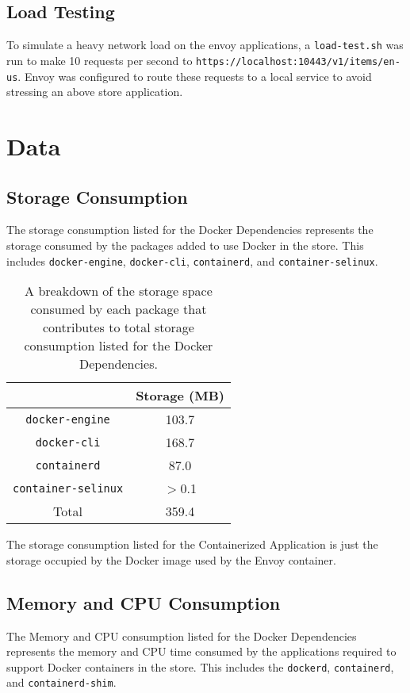\documentclass{article}
\begin{document}
\subsection{Load Testing}
To simulate a heavy network load on the envoy applications, a \texttt{load-test.sh} was run to make 10 requests per second to \texttt{https://localhost:10443/v1/items/en-us}. Envoy was configured to route these requests to a local service to avoid stressing an above store application.

\section{Data}
\subsection{Storage Consumption}
The storage consumption listed for the Docker Dependencies represents the storage consumed by the packages added to use Docker in the store. This includes \texttt{docker-engine}, \texttt{docker-cli}, \texttt{containerd}, and \texttt{container-selinux}.

\begin{table}[H]
\begin{tabular}{ |c|c| }
 \hline
   & Storage (MB) \\ 
 \hline
 \texttt{docker-engine} & 103.7 \\
 \hline
 \texttt{docker-cli} & 168.7 \\
 \hline
 \texttt{containerd} & 87.0 \\
 \hline
 \texttt{container-selinux} & $>$0.1 \\
 \hline\hline
 Total & 359.4 \\
 \hline
\end{tabular}
\caption{A breakdown of the storage space consumed by each package that contributes to total storage consumption listed for the Docker Dependencies.}
\label{storage-breakdown}
\end{table}

The storage consumption listed for the Containerized Application is just the storage occupied by the Docker image used by the Envoy container.

\subsection{Memory and CPU Consumption}
The Memory and CPU consumption listed for the Docker Dependencies represents the memory and CPU time consumed by the applications required to support Docker containers in the store. This includes the \texttt{dockerd}, \texttt{containerd}, and \texttt{containerd-shim}.
\end{document}
